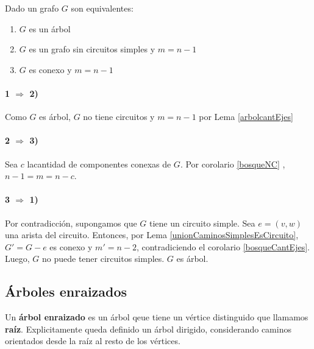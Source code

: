 \begin{theorem}
	Dado un grafo \(G\) son equivalentes:
	\begin{enumerate}
		\item \(G\) es un árbol
		\item \(G\) es un grafo sin circuitos simples y \(m = n-1\)
		\item \(G\) es conexo y \(m = n - 1\)
	\end{enumerate}
\end{theorem}
\begin{demo}
	\paragraph{1 \(\Rightarrow\) 2)} Como \(G\) es árbol, \(G\) no tiene circuitos y \(m = n - 1\) por Lema \ref{arbolcantEjes}
	\paragraph{2 \(\Rightarrow\) 3)} Sea \(c\) lacantidad de componentes conexas de \(G\). Por corolario \ref{bosqueNC} , \(n - 1 = m = n - c\).
	\paragraph{3 \(\Rightarrow\)  1)} Por contradicción, supongamos que \(G\) tiene un circuito simple. Sea \(e = (v,w)\) una arista del circuito. Entonces, por Lema \ref{unionCaminosSimplesEsCircuito}, \(G' = G - e\) es conexo y \(m' = n - 2\), contradiciendo el corolario \ref{bosqueCantEjes}. Luego, \(G\) no puede tener circuitos simples. \(G\) es árbol.
\end{demo}

\subsection{Árboles enraizados}
Un \textbf{árbol enraizado} es un árbol qeue tiene un vértice distinguido que llamamos \textbf{raíz}. Explicitamente queda definido un árbol dirigido, considerando caminos orientados desde la raíz al resto de los vértices. 

